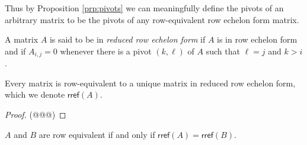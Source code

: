 Thus by Proposition \ref{prp:pivots} we can meaningfully define the pivots of an arbitrary matrix to be the pivots of any row-equivalent row echelon form matrix.

\begin{dfn}
A matrix $A$ is said to be in \emph{reduced row echelon form} if $A$ is in row echelon form and if $A_{i,j} = 0$ whenever there is a pivot $(k,\ell)$ of $A$ such that $\ell = j$ and $k > i$.
\end{dfn}

\begin{prp}
Every matrix is row-equivalent to a unique matrix in reduced row echelon form, which we denote $\mathsf{rref}(A)$.
\end{prp}

\begin{proof}
(@@@)
\end{proof}

\begin{cor}
$A$ and $B$ are row equivalent if and only if $\mathsf{rref}(A) = \mathsf{rref}(B)$.
\end{cor}